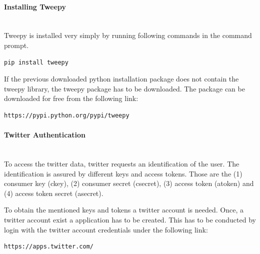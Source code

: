 \documentclass[a4paper,12pt]{article}
\begin{document}
\begin{spacing}{1.2}
\paragraph{Installing Tweepy}\mbox{}\\{}
Tweepy is installed very simply by running following commands in the command prompt. 
\begin{lstlisting}[language=bash]
pip install tweepy
\end{lstlisting}

If the previous downloaded python installation package does not contain the tweepy library, the tweepy package has to be downloaded. The package can be downloaded for free from the following link:
\begin{lstlisting}[language=bash]
https://pypi.python.org/pypi/tweepy
\end{lstlisting}

\paragraph{Twitter Authentication}\mbox{}\\{}
To access the twitter data, twitter requests an identification of the user. The identification is assured by different keys and access tokens. Those are the (1) consumer key (ckey), (2) consumer secret (csecret), (3) access token (atoken) and (4) access token secret (asecret).

To obtain the mentioned keys and tokens a twitter account is needed. Once, a twitter account exist a application has to be created. This has to be conducted by login with the twitter account credentials under the following link: 
\begin{lstlisting}[language=bash]
https://apps.twitter.com/
\end{lstlisting}


\end{spacing}
\end{document}
